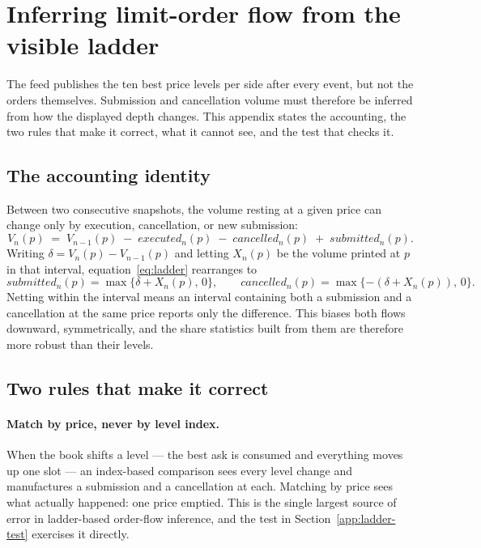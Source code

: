 \section{Inferring limit-order flow from the visible ladder}
\label{app:ladder}

The feed publishes the ten best price levels per side after every event, but not
the orders themselves. Submission and cancellation volume must therefore be
inferred from how the displayed depth changes. This appendix states the
accounting, the two rules that make it correct, what it cannot see, and the test
that checks it.

\subsection{The accounting identity}

Between two consecutive snapshots, the volume resting at a given price can change
only by execution, cancellation, or new submission:
%
\begin{equation}
V_n(p) \;=\; V_{n-1}(p) \;-\; \mathit{executed}_n(p) \;-\; \mathit{cancelled}_n(p)
\;+\; \mathit{submitted}_n(p).
\label{eq:ladder}
\end{equation}
%
Writing $\delta = V_n(p) - V_{n-1}(p)$ and letting $X_n(p)$ be the volume printed
at $p$ in that interval, equation~\eqref{eq:ladder} rearranges to
%
\begin{equation}
\mathit{submitted}_n(p) = \max\{\delta + X_n(p),\,0\},
\qquad
\mathit{cancelled}_n(p) = \max\{-(\delta + X_n(p)),\,0\}.
\end{equation}
%
Netting within the interval means an interval containing both a submission and a
cancellation at the same price reports only the difference. This biases both
flows downward, symmetrically, and the share statistics built from them are
therefore more robust than their levels.

\subsection{Two rules that make it correct}

\paragraph{Match by price, never by level index.}
When the book shifts a level --- the best ask is consumed and everything moves up
one slot --- an index-based comparison sees every level change and manufactures a
submission and a cancellation at each. Matching by price sees what actually
happened: one price emptied. This is the single largest source of error in
ladder-based order-flow inference, and the test in
Section~\ref{app:ladder-test} exercises it directly.

